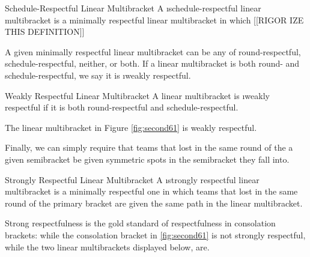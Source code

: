 {    \begin{definition}{Schedule-Respectful Linear Multibracket}{}
        A \i{schedule-respectful} linear multibracket is a minimally respectful linear multibracket in which [[RIGOR IZE THIS DEFINITION]]
    \end{definition}

    A given minimally respectful linear multibracket can be any of round-respectful, schedule-respectful, neither, or both. If a linear multibracket is both round- and schedule-respectful, we say it is \i{weakly respectful}.

    \begin{definition}{Weakly Respectful Linear Multibracket}{}
        A linear multibracket is \i{weakly respectful} if it is both round-respectful and schedule-respectful.
    \end{definition}

    The linear multibracket in Figure \ref{fig:second61} is weakly respectful.


    Finally, we can simply require that teams that lost in the same round of the a given semibracket be given symmetric spots in the semibracket they fall into.

    \begin{definition}{Strongly Respectful Linear Multibracket}{}
        A \i{strongly respectful} linear multibracket is a minimally respectful one in which teams that lost in the same round of the primary bracket are given the same path in the linear multibracket.
    \end{definition}

    Strong respectfulness is the gold standard of respectfulness in consolation brackets: while the consolation bracket in \ref{fig:second61} is not strongly respectful, while the two linear multibrackets displayed below, are.


    
}
